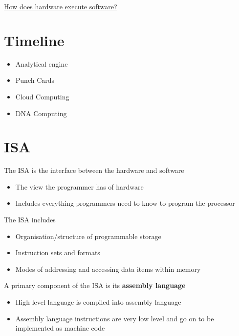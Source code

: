 \documentclass{article}[18pt]
\begin{document}
\begin{center}
\underline{\huge How does hardware execute software?}
\end{center}
\section{Timeline}
\begin{itemize}
\item Analytical engine
\item Punch Cards
\item Cloud Computing
\item DNA Computing
\end{itemize}
\section{ISA}
The ISA is the interface between the hardware and software
\begin{itemize}
\item The view the programmer has of hardware
\item Includes everything programmers need to know to program the processor
\end{itemize}
The ISA includes
\begin{itemize}
\item Organisation/structure of programmable storage
\item Instruction sets and formats
\item Modes of addressing and accessing data items within memory
\end{itemize}
A primary component of the ISA is its \textbf{assembly language}
\begin{itemize}
\item High level language is compiled into assembly language
\item Assembly language instructions are very low level and go on to be implemented as machine code
\end{itemize}
\end{document}
